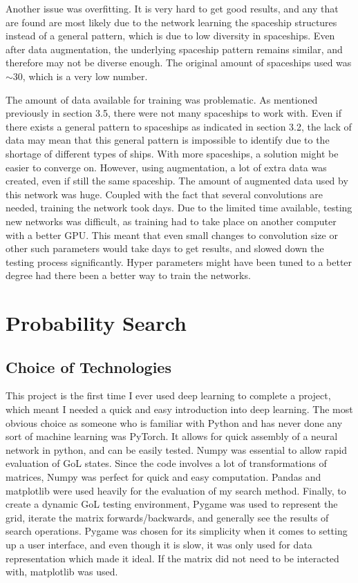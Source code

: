 \documentclass{l4proj}
\begin{document}
Another issue was overfitting. It is very hard to get good results, and any that are found are most likely due to the network learning the spaceship structures instead of a general pattern, which is due to low diversity in spaceships. Even after data augmentation, the underlying spaceship pattern remains similar, and therefore may not be diverse enough. The original amount of spaceships used was $\sim 30$, which is a very low number. 

The amount of data available for training was problematic. As mentioned previously in section 3.5, there were not many spaceships to work with. Even if there exists a general pattern to spaceships as indicated in section 3.2, the lack of data may mean that this general pattern is impossible to identify due to the shortage of different types of ships. With more spaceships, a solution might be easier to converge on. However, using augmentation, a lot of extra data was created, even if still the same spaceship. The amount of augmented data used by this network was huge. Coupled with the fact that several convolutions are needed, training the network took days. Due to the limited time available, testing new networks was difficult, as training had to take place on another computer with a better GPU. This meant that even small changes to convolution size or other such parameters would take days to get results, and slowed down the testing process significantly. Hyper parameters might have been tuned to a better degree had there been a better way to train the networks.


\section{Probability Search}

\subsection{Choice of Technologies}

This project is the first time I ever used deep learning to complete a project, which meant I needed a quick and easy introduction into deep learning. The most obvious choice as someone who is familiar with Python and has never done any sort of machine learning was PyTorch. It allows for quick assembly of a neural network in python, and can be easily tested. Numpy was essential to allow rapid evaluation of GoL states. Since the code involves a lot of transformations of matrices, Numpy was perfect for quick and easy computation. Pandas and matplotlib were used heavily for the evaluation of my search method. Finally, to create a dynamic GoL testing environment, Pygame was used to represent the grid, iterate the matrix forwards/backwards, and generally see the results of search operations. Pygame was chosen for its simplicity when it comes to setting up a user interface, and even though it is slow, it was only used for data representation which made it ideal. If the matrix did not need to be interacted with, matplotlib was used. 
\end{document}

